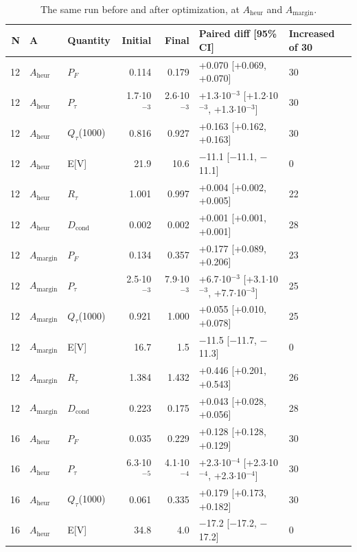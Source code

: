 \documentclass[journal]{IEEEtran}
\begin{document}
\begin{table}[!t]
\centering
\scriptsize
\caption{The same run before and after optimization, at $A_{\mathrm{heur}}$ and $A_{\mathrm{margin}}$.}
\label{tab:S34}
\begin{tabular}{rllrrp{}p{}}
\toprule
N & A & Quantity & Initial & Final & Paired diff [95\% CI] & Increased of 30 \\
\midrule
12 & $A_{\mathrm{heur}}$ & $P_{F}$ & 0.114 & 0.179 & +0.070 [+0.069, +0.070] & 30 \\
12 & $A_{\mathrm{heur}}$ & $P_{\tau}$ & 1.7$\cdot$10$^{-3}$ & 2.6$\cdot$10$^{-3}$ & +1.3$\cdot$10$^{-3}$ [+1.2$\cdot$10$^{-3}$, +1.3$\cdot$10$^{-3}$] & 30 \\
12 & $A_{\mathrm{heur}}$ & $Q_{\tau}$(1000) & 0.816 & 0.927 & +0.163 [+0.162, +0.163] & 30 \\
12 & $A_{\mathrm{heur}}$ & E[V] & 21.9 & 10.6 & $-$11.1 [$-$11.1, $-$11.1] & 0 \\
12 & $A_{\mathrm{heur}}$ & $R_{\tau}$ & 1.001 & 0.997 & +0.004 [+0.002, +0.005] & 22 \\
12 & $A_{\mathrm{heur}}$ & $D_{\mathrm{cond}}$ & 0.002 & 0.002 & +0.001 [+0.001, +0.001] & 28 \\
12 & $A_{\mathrm{margin}}$ & $P_{F}$ & 0.134 & 0.357 & +0.177 [+0.089, +0.206] & 23 \\
12 & $A_{\mathrm{margin}}$ & $P_{\tau}$ & 2.5$\cdot$10$^{-3}$ & 7.9$\cdot$10$^{-3}$ & +6.7$\cdot$10$^{-3}$ [+3.1$\cdot$10$^{-3}$, +7.7$\cdot$10$^{-3}$] & 25 \\
12 & $A_{\mathrm{margin}}$ & $Q_{\tau}$(1000) & 0.921 & 1.000 & +0.055 [+0.010, +0.078] & 25 \\
12 & $A_{\mathrm{margin}}$ & E[V] & 16.7 & 1.5 & $-$11.5 [$-$11.7, $-$11.3] & 0 \\
12 & $A_{\mathrm{margin}}$ & $R_{\tau}$ & 1.384 & 1.432 & +0.446 [+0.201, +0.543] & 26 \\
12 & $A_{\mathrm{margin}}$ & $D_{\mathrm{cond}}$ & 0.223 & 0.175 & +0.043 [+0.028, +0.056] & 28 \\
16 & $A_{\mathrm{heur}}$ & $P_{F}$ & 0.035 & 0.229 & +0.128 [+0.128, +0.129] & 30 \\
16 & $A_{\mathrm{heur}}$ & $P_{\tau}$ & 6.3$\cdot$10$^{-5}$ & 4.1$\cdot$10$^{-4}$ & +2.3$\cdot$10$^{-4}$ [+2.3$\cdot$10$^{-4}$, +2.3$\cdot$10$^{-4}$] & 30 \\
16 & $A_{\mathrm{heur}}$ & $Q_{\tau}$(1000) & 0.061 & 0.335 & +0.179 [+0.173, +0.182] & 30 \\
16 & $A_{\mathrm{heur}}$ & E[V] & 34.8 & 4.0 & $-$17.2 [$-$17.2, $-$17.2] & 0 \\

\end{tabular}
\end{table}
\end{document}
